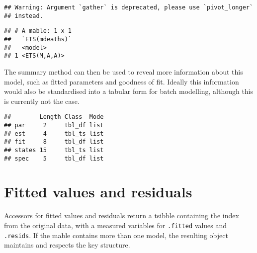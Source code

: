 \documentclass[]{book}
\newenvironment{Shaded}{\begin{snugshade}}{\end{snugshade}}
\newcommand{\KeywordTok}[1]{\textcolor[rgb]{0.13,0.29,0.53}{\textbf{#1}}}
\newcommand{\NormalTok}[1]{#1}
\newcommand{\OperatorTok}[1]{\textcolor[rgb]{0.81,0.36,0.00}{\textbf{#1}}}
\newcommand{\StringTok}[1]{\textcolor[rgb]{0.31,0.60,0.02}{#1}}
\begin{document}
\begin{verbatim}
## Warning: Argument `gather` is deprecated, please use `pivot_longer`
## instead.
\end{verbatim}

\begin{Shaded}
\end{Shaded}

\begin{verbatim}
## # A mable: 1 x 1
##   `ETS(mdeaths)`
##   <model>       
## 1 <ETS(M,A,A)>
\end{verbatim}

The summary method can then be used to reveal more information about this model, such as fitted parameters and goodness of fit. Ideally this information would also be standardised into a tabular form for batch modelling, although this is currently not the case.

\begin{Shaded}
\end{Shaded}

\begin{verbatim}
##        Length Class  Mode
## par     2     tbl_df list
## est     4     tbl_ts list
## fit     8     tbl_df list
## states 15     tbl_ts list
## spec    5     tbl_df list
\end{verbatim}

\hypertarget{fitted-values-and-residuals}{%
\section{Fitted values and residuals}\label{fitted-values-and-residuals}}

Accessors for fitted values and residuals return a tsibble containing the index from the original data, with a measured variables for \texttt{.fitted} values and \texttt{.resids}. If the mable contains more than one model, the resulting object maintains and respects the key structure.

\begin{Shaded}
\end{Shaded}
\end{document}
